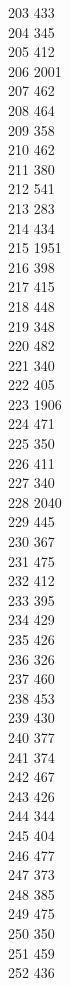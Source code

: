 { 203	433 \\
 204	345 \\
 205	412 \\
 206	2001 \\
 207	462 \\
 208	464 \\
 209	358 \\
 210	462 \\
 211	380 \\
 212	541 \\
 213	283 \\
 214	434 \\
 215	1951 \\
 216	398 \\
 217	415 \\
 218	448 \\
 219	348 \\
 220	482 \\
 221	340 \\
 222	405 \\
 223	1906 \\
 224	471 \\
 225	350 \\
 226	411 \\
 227	340 \\
 228	2040 \\
 229	445 \\
 230	367 \\
 231	475 \\
 232	412 \\
 233	395 \\
 234	429 \\
 235	426 \\
 236	326 \\
 237	460 \\
 238	453 \\
 239	430 \\
 240	377 \\
 241	374 \\
 242	467 \\
 243	426 \\
 244	344 \\
 245	404 \\
 246	477 \\
 247	373 \\
 248	385 \\
 249	475 \\
 250	350 \\
 251	459 \\
 252	436 \\
}
